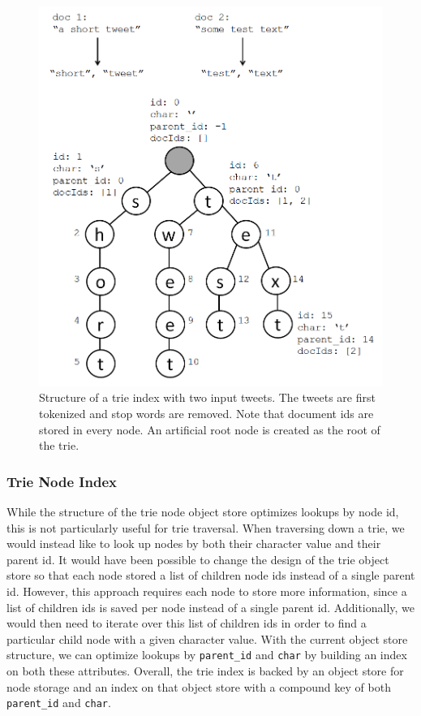 \documentclass{vldb}
\begin{document}
\begin{figure}[h!]
  \centering
   \includegraphics[scale=.35]{trie_figure}
  \caption{Structure of a trie index with two input tweets. The tweets are first tokenized and stop words are removed. Note that document ids are stored in every node. An artificial root node is created as the root of the trie.}
\label{trie}
\end{figure}

\subsubsection{Trie Node Index}
While the structure of the trie node object store optimizes lookups by node id, this is not particularly useful for trie traversal. When traversing down a trie, we would instead like to look up nodes by both their character value and their parent id. It would have been possible to change the design of the trie object store so that each node stored a list of children node ids instead of a single parent id. However, this approach requires each node to store more information, since a list of children ids is saved per node instead of a single parent id. Additionally, we would then need to iterate over this list of children ids in order to find a particular child node with a given character value. With the current object store structure, we can optimize lookups by \texttt{parent\_id} and \texttt{char} by building an index on both these attributes. Overall, the trie index is backed by an object store for node storage and an index on that object store with a compound key of both \texttt{parent\_id} and \texttt{char}.
\end{document}
